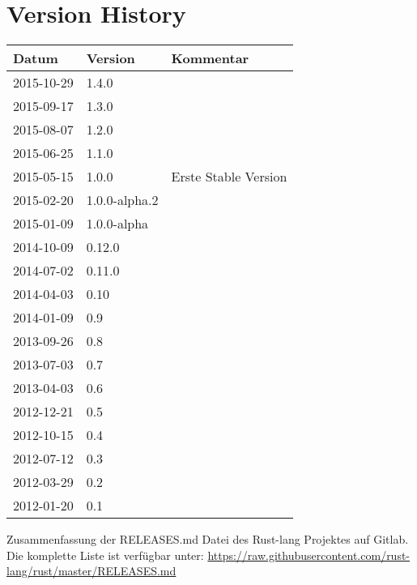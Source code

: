 \section{Version History}


\begin{tabular}{|l|l|l|}
	\hline Datum & Version & Kommentar \\ \hline
	\hline 2015-10-29 & 1.4.0 &  \\ 
	\hline 2015-09-17 & 1.3.0 &  \\ 
	\hline 2015-08-07 & 1.2.0 &  \\ 
	\hline 2015-06-25 & 1.1.0 & \\
	\hline 2015-05-15 & 1.0.0 & Erste Stable Version\\
	\hline 2015-02-20 & 1.0.0-alpha.2 & \\
	\hline 2015-01-09 & 1.0.0-alpha & \\
	\hline 2014-10-09 & 0.12.0 &  \\
	\hline 2014-07-02 & 0.11.0 & \\
	\hline 2014-04-03 & 0.10 & \\
	\hline 2014-01-09 & 0.9 & \\
	\hline 2013-09-26 & 0.8 & \\
	\hline 2013-07-03 & 0.7 & \\
	\hline 2013-04-03 & 0.6 & \\
	\hline 2012-12-21 & 0.5 & \\
	\hline 2012-10-15 & 0.4 & \\
	\hline 2012-07-12 & 0.3 & \\
	\hline 2012-03-29 & 0.2 & \\
	\hline 2012-01-20 & 0.1 & \\
	\hline 
\end{tabular} 

Zusammenfassung der RELEASES.md Datei des Rust-lang Projektes auf Gitlab.
Die komplette Liste ist verfügbar unter: 
\url{https://raw.githubusercontent.com/rust-lang/rust/master/RELEASES.md}